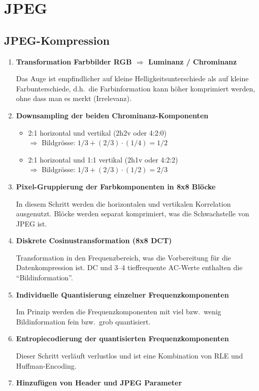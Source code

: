 \section{JPEG}\label{sec:jpeg}

\subsection{JPEG-Kompression}\label{subsec:jpeg-kompression}

\begin{enumerate}[label={\bfseries Schritt \arabic*:}, wide=0pt]
    \item \textbf{Transformation Farbbilder RGB $\Rightarrow$ Luminanz / Chrominanz}

    Das Auge ist empfindlicher auf kleine Helligkeitsunterschiede als auf kleine Farbunterschiede, d.h.\ die Farbinformation kann höher komprimiert werden, ohne dass man es merkt (Irrelevanz).

    \item \textbf{Downsampling der beiden Chrominanz-Komponenten}

    \begin{itemize}
        \item 2:1 horizontal und vertikal (2h2v oder 4:2:0) \\
        $\Rightarrow$ Bildgrösse: $1/3 + (2/3) \cdot (1/4) = 1/2$
        \item 2:1 horizontal und 1:1 vertikal (2h1v oder 4:2:2) \\
        $\Rightarrow$ Bildgrösse: $1/3 + (2/3) \cdot (1/2) = 2/3$
    \end{itemize}

    \item \textbf{Pixel-Gruppierung der Farbkomponenten in 8x8 Blöcke}

    In diesem Schritt werden die horizontalen und vertikalen Korrelation ausgenutzt.
    Blöcke werden separat komprimiert, was die Schwachstelle von JPEG ist.

    \item \textbf{Diskrete Cosinustransformation (8x8 DCT)}

    Transformation in den Frequenzbereich, was die Vorbereitung für die Datenkompression ist.
    DC und 3--4 tieffrequente AC-Werte enthalten die ``Bildinformation''.

    \item \textbf{Individuelle Quantisierung einzelner Frequenzkomponenten}

    Im Prinzip werden die Frequenzkomponenten mit viel bzw.\ wenig Bildinformation fein bzw.\ grob quantisiert.

    \item \textbf{Entropiecodierung der quantisierten Frequenzkomponenten}

    Dieser Schritt verläuft verlustlos und ist eine Kombination von RLE und Huffman-Encoding.

    \item \textbf{Hinzufügen von Header und JPEG Parameter}
\end{enumerate}

